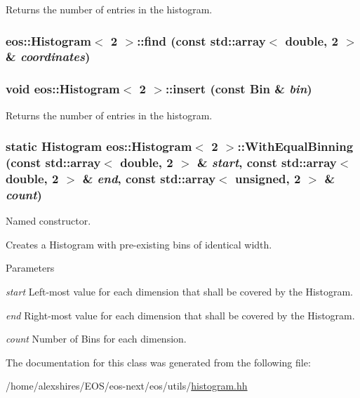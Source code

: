 Returns the number of entries in the histogram. \hypertarget{classeos_1_1Histogram_3_012_01_4_a232eeac19611c37c38a41afa7cb7f32d}{
\subsubsection[{find}]{ eos::Histogram$<$ 2 $>$::find (const std::array$<$ double, 2 $>$ \& {\em coordinates})}}
\label{classeos_1_1Histogram_3_012_01_4_a232eeac19611c37c38a41afa7cb7f32d}
\hypertarget{classeos_1_1Histogram_3_012_01_4_a28aa2e33aa1e9b3dc90e02a7ea138dcf}{
\subsubsection[{insert}]{\setlength{\rightskip}{0pt plus 5cm}void eos::Histogram$<$ 2 $>$::insert (const Bin \& {\em bin})}}
\label{classeos_1_1Histogram_3_012_01_4_a28aa2e33aa1e9b3dc90e02a7ea138dcf}


Returns the number of entries in the histogram. \hypertarget{classeos_1_1Histogram_3_012_01_4_ac029776d8b8b56356e073928be272d02}{
\subsubsection[{WithEqualBinning}]{\setlength{\rightskip}{0pt plus 5cm}static Histogram eos::Histogram$<$ 2 $>$::WithEqualBinning (const std::array$<$ double, 2 $>$ \& {\em start}, \/  const std::array$<$ double, 2 $>$ \& {\em end}, \/  const std::array$<$ unsigned, 2 $>$ \& {\em count})}}
\label{classeos_1_1Histogram_3_012_01_4_ac029776d8b8b56356e073928be272d02}
Named constructor.

Creates a Histogram with pre-\/existing bins of identical width. 
\begin{DoxyParams}{Parameters}
\item[{\em start}]Left-\/most value for each dimension that shall be covered by the Histogram. \item[{\em end}]Right-\/most value for each dimension that shall be covered by the Histogram. \item[{\em count}]Number of Bins for each dimension. \end{DoxyParams}


The documentation for this class was generated from the following file:\begin{DoxyCompactItemize}
\item 
/home/alexshires/EOS/eos-\/next/eos/utils/\hyperlink{histogram_8hh}{histogram.hh}\end{DoxyCompactItemize}
